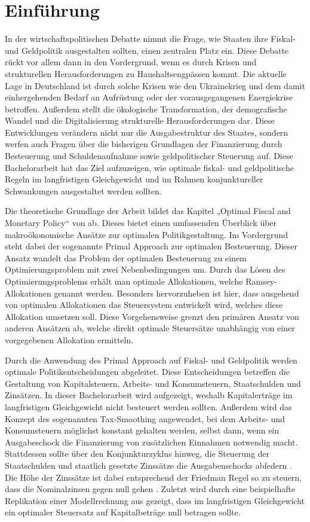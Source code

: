\section{Einführung}

In der wirtschaftspolitischen Debatte nimmt die Frage, wie Staaten ihre Fiskal- und Geldpolitik ausgestalten sollten, einen zentralen Platz ein. Diese Debatte rückt vor allem dann in den Vordergrund, wenn es durch Krisen und strukturellen Herausforderungen zu Haushaltsengpässen kommt. Die aktuelle Lage in Deutschland ist durch solche Krisen wie den Ukrainekrieg und dem damit einhergehenden Bedarf an Aufrüstung oder der vorausgegangenen Energiekrise betroffen. Au{\ss}erdem stellt die ökologische Transformation, der demografische Wandel und die Digitalisierung strukturelle Herausforderungen dar. Diese Entwicklungen verändern nicht nur die Ausgabestruktur des Staates, sondern werfen auch Fragen über die bisherigen Grundlagen der Finanzierung durch Besteuerung und Schuldenaufnahme sowie geldpolitischer Steuerung auf. 
Diese Bachelorarbeit hat das Ziel aufzuzeigen, wie optimale fiskal- und geldpolitische Regeln im langfristigen Gleichgewicht und im Rahmen konjunktureller Schwankungen ausgestaltet werden sollten.

Die theoretische Grundlage der Arbeit bildet das Kapitel „Optimal Fiscal and Monetary Policy“ von \cite{ChariKehoe1999} ab. Dieses bietet einen umfassenden Überblick über makroökonomische Ansätze zur optimalen Politikgestaltung. Im Vordergrund steht dabei der sogenannte Primal Approach zur optimalen Besteuerung. Dieser Ansatz wandelt das Problem der optimalen Besteuerung zu einem Optimierungsproblem mit zwei Nebenbedingungen um. Durch das Lösen des Optimierungsproblems erhält man optimale Allokationen, welche Ramsey-Allokationen genannt werden. Besonders hervorzuheben ist hier, dass ausgehend von optimalen Allokationen das Steuersystem entwickelt wird, welches diese Allokation umsetzen soll. Diese Vorgehensweise grenzt den primären Ansatz von anderen Ansätzen ab, welche direkt optimale Steuersätze unabhängig von einer vorgegebenen Allokation ermitteln.

Durch die Anwendung des Primal Approach auf Fiskal- und Geldpolitik werden optimale Politikentscheidungen abgeleitet. Diese Entscheidungen betreffen die Gestaltung von Kapitalsteuern, Arbeits- und Konsumsteuern, Staatschulden und Zinsätzen. In dieser Bachelorarbeit wird aufgezeigt, weshalb Kapitalerträge im langfristigen Gleichgewicht nicht besteuert werden sollten. Au{\ss}erdem wird das Konzept des sogenannten Tax-Smoothing angewendet, bei dem Arbeits- und Konsumsteuern möglichst konstant gehalten werden, selbst dann, wenn ein Ausgabeschock die Finanzierung von zusätzlichen Einnahmen notwendig macht. Stattdessen sollte über den Konjunkturzyklus hinweg, die Steuerung der Staatschulden und staatlich gesetzte Zinssätze die Ausgabenschocks abfedern \cite{Barro1979}. Die Höhe der Zinssätze ist dabei entsprechend der Friedman Regel so zu steuern, dass die Nominalzinsen gegen null gehen \cite{Friedman1969}. Zuletzt wird durch eine beispielhafte Replikation einer Modellrechnung aus \cite{ChariKehoe1999} gezeigt, dass im langfristigen Gleichgewicht ein optimaler Steuersatz auf Kapitalbeträge null betragen sollte. 

